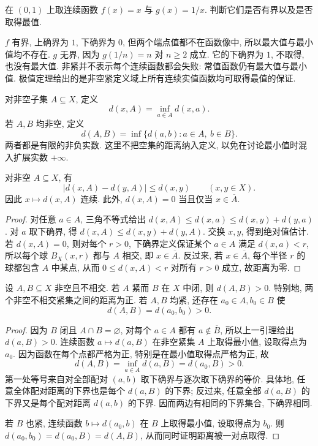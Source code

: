 \begin{example}
在 $(0,1)$ 上取连续函数 $f(x)=x$ 与 $g(x)=1/x$. 判断它们是否有界以及是否取得最值.
\end{example}
\begin{solution}
$f$ 有界, 上确界为 $1$, 下确界为 $0$, 但两个端点值都不在函数像中, 所以最大值与最小值均不存在. $g$ 无界, 因为 $g(1/n)=n$ 对 $n\geq2$ 成立. 它的下确界为 $1$, 不取得, 也没有最大值. 非紧并不表示每个连续函数都会失败: 常值函数仍有最大值与最小值. 极值定理给出的是非空紧定义域上所有连续实值函数均可取得最值的保证.
\end{solution}

\begin{definition}
对非空子集 $A\subseteq X$, 定义
\[
 d(x,A)=\inf_{a\in A}d(x,a).
\]
若 $A,B$ 均非空, 定义
\[
 d(A,B)=\inf\{d(a,b):a\in A,\ b\in B\}.
\]
两者都是有限的非负实数. 这里不把空集的距离纳入定义, 以免在讨论最小值时混入扩展实数 $+\infty$.
\end{definition}

\begin{lemma}[距离函数的连续性]
\label{ch:compact:distance-function}
对非空 $A\subseteq X$, 有
\[
 |d(x,A)-d(y,A)|\leq d(x,y)
 \qquad(x,y\in X).
\]
因此 $x\mapsto d(x,A)$ 连续. 此外, $d(x,A)=0$ 当且仅当 $x\in\overline A$.
\end{lemma}
\begin{proof}
对任意 $a\in A$, 三角不等式给出 $d(x,A)\leq d(x,a)\leq d(x,y)+d(y,a)$. 对 $a$ 取下确界, 得 $d(x,A)\leq d(x,y)+d(y,A)$. 交换 $x,y$, 得到绝对值估计. 若 $d(x,A)=0$, 则对每个 $r>0$, 下确界定义保证某个 $a\in A$ 满足 $d(x,a)<r$, 所以每个球 $B_X(x,r)$ 都与 $A$ 相交, 即 $x\in\overline A$. 反过来, 若 $x\in\overline A$, 每个半径 $r$ 的球都包含 $A$ 中某点, 从而 $0\leq d(x,A)<r$ 对所有 $r>0$ 成立, 故距离为零.
\end{proof}

\begin{theorem}[紧集与闭集的正距离]
\label{ch:compact:positive-distance}
设 $A,B\subseteq X$ 非空且不相交. 若 $A$ 紧而 $B$ 在 $X$ 中闭, 则 $d(A,B)>0$. 特别地, 两个非空不相交紧集之间的距离为正. 若 $A,B$ 均紧, 还存在 $a_0\in A,b_0\in B$ 使
\[
 d(A,B)=d(a_0,b_0)>0.
\]
\end{theorem}
\begin{proof}
因为 $B$ 闭且 $A\cap B=\varnothing$, 对每个 $a\in A$ 都有 $a\notin\overline B$, 所以上一引理给出 $d(a,B)>0$. 连续函数 $a\mapsto d(a,B)$ 在非空紧集 $A$ 上取得最小值, 设取得点为 $a_0$. 因为函数在每个点都严格为正, 特别是在最小值取得点严格为正, 故
\[
 d(A,B)=\inf_{a\in A}d(a,B)=d(a_0,B)>0.
\]
第一处等号来自对全部配对 $(a,b)$ 取下确界与逐次取下确界的等价. 具体地, 任意全体配对距离的下界也是每个 $d(a,B)$ 的下界; 反过来, 任意全部 $d(a,B)$ 的下界又是每个配对距离 $d(a,b)$ 的下界. 因而两边有相同的下界集合, 下确界相同.

若 $B$ 也紧, 连续函数 $b\mapsto d(a_0,b)$ 在 $B$ 上取得最小值, 设取得点为 $b_0$. 则 $d(a_0,b_0)=d(a_0,B)=d(A,B)$, 从而同时证明距离被一对点取得.
\end{proof}

